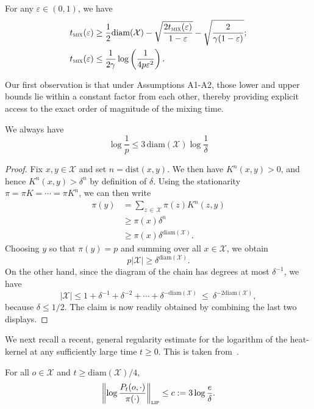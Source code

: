 \documentclass[AHL,Unicode,longabstracts,published]{cedram}
\newcommand{\cX}{\mathcal{X}}
\newcommand{\dist}{\mathrm{dist}}
\newcommand{\pim}{p}
\newcommand{\tmix}{t_{\textsc{mix}}}
\newcommand{\diam}{\mathrm{diam}}
\begin{document}
\begin{lemm}\label{lm:tmix}
For any $\varepsilon\in(0,1)$, we have
\begin{align*}
\tmix(\varepsilon) & \ge \frac{1}{2}\diam(\cX)-\sqrt{\frac{2\tmix(\varepsilon)}{1-\varepsilon}}-\sqrt{\frac{2}{\gamma(1-\varepsilon)}};\\
\tmix(\varepsilon) & \le \frac{1}{2\gamma}\log\left(\frac{1}{4\pim\varepsilon^2}\right).
\end{align*}
\end{lemm}

Our first observation is that under Assumptions A1-A2, those lower and upper bounds lie within a constant factor from each other, thereby providing explicit access to the exact order of magnitude of the mixing time.

\begin{lemm}[Control on $\pim$]\label{lm:pim}
We always have
\[
\log \frac{1}{\pim} \le 3\,\diam(\cX)\log \frac{1}{\delta}
\]
\end{lemm}

\begin{proof}
Fix $x,y\in\cX$ and set $n=\dist(x,y)$. We then have $K^n(x,y)>0$, and hence $K^n(x,y)>\delta^n$ by definition of $\delta$. Using the stationarity $\pi=\pi K=\cdots =\pi K^n$, we can then write
\begin{align*}
\pi(y) & = \sum_{z\,\in\,\cX}\pi(z)K^n(z,y)\\
& \ge \pi(x)\delta^{n}\\
& \ge \pi(x)\delta^{\diam(\cX)}.
\end{align*}
Choosing $y$ so that $\pi(y)=\pim$ and summing over all $x\in\cX$, we obtain
\[
\pim|\cX| \ge \delta^{\diam(\cX)}.
\]
On the other hand, since the diagram of the chain has degrees at most $\delta^{-1}$, we have
\[
|\cX| \le 1+\delta^{-1}+\delta^{-2}+\cdots+\delta^{-\diam(\cX)} \ \le \ \delta^{-2\diam(\cX)},
\]
because $\delta\le 1/2$. The claim is now readily obtained by combining the last two displays.
\end{proof}

We next recall a recent, general regularity estimate for the logarithm of the heat-kernel at any sufficiently large time $t\ge 0$. This is taken from~\cite[Lemma~10]{arxiv.2102.05597}.

\begin{lemm}\label{lm:lip}
For all $o\in\cX$ and $t\ge \diam(\cX)/4$,
\[
\left\|\log \frac{P_t(o,\cdot)}{\pi(\cdot)}\right\|_{\textsc{lip}} \le c := 3\log \frac{e}{\delta}.
\]
\end{lemm}
\end{document}
